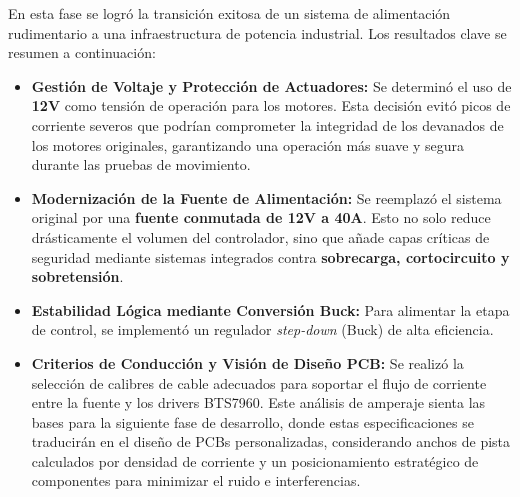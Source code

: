 \begin{resultadosFase}
	\vspace{0.4cm}
	En esta fase se logró la transición exitosa de un sistema de alimentación rudimentario a una infraestructura de potencia industrial. Los resultados clave se resumen a continuación:
	
	\begin{itemize}
		\item \textbf{Gestión de Voltaje y Protección de Actuadores:} Se determinó el uso de \textbf{12V} como tensión de operación para los motores. Esta decisión evitó picos de corriente severos que podrían comprometer la integridad de los devanados de los motores originales, garantizando una operación más suave y segura durante las pruebas de movimiento.
		
		\item \textbf{Modernización de la Fuente de Alimentación:} Se reemplazó el sistema original por una \textbf{fuente conmutada de 12V a 40A}. Esto no solo reduce drásticamente el volumen del controlador, sino que añade capas críticas de seguridad mediante sistemas integrados contra \textbf{sobrecarga, cortocircuito y sobretensión}.
		
		\item \textbf{Estabilidad Lógica mediante Conversión Buck:} Para alimentar la etapa de control, se implementó un regulador \textit{step-down} (Buck) de alta eficiencia. 
		
		\item \textbf{Criterios de Conducción y Visión de Diseño PCB:} Se realizó la selección de calibres de cable adecuados para soportar el flujo de corriente entre la fuente y los drivers BTS7960. Este análisis de amperaje sienta las bases para la siguiente fase de desarrollo, donde estas especificaciones se traducirán en el diseño de PCBs personalizadas, considerando anchos de pista calculados por densidad de corriente y un posicionamiento estratégico de componentes para minimizar el ruido e interferencias.
	\end{itemize}
\end{resultadosFase}